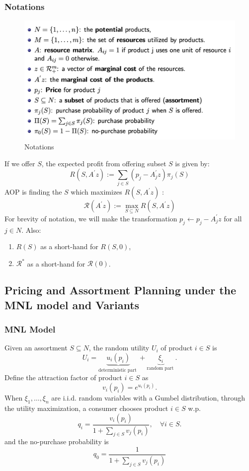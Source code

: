 \documentclass[11pt,a4paper]{article}
\begin{document}
\subsubsection{ Notations}
\begin{center}\begin{figure}[htbp]
    \centering
    \includegraphics[scale=0.4]{A2.png}
    \caption{Notations}
    \label{}
\end{figure}\end{center}
If we offer $S$, the expected profit from offering subset $S$ is given by:
$$
R\left(S, A^{\prime} z\right):=\sum_{j \in S}\left(p_{j}-A_{j}^{\prime} z\right) \pi_{j}(S)
$$
AOP is finding the $S$ which maximizes $R\left(S, A^{\prime} z\right)$ :
$$
\mathcal{R}\left(A^{\prime} z\right):=\max _{S \subseteq N} R\left(S, A^{\prime} z\right)
$$
For brevity of notation, we will make the transformation $p_{j} \leftarrow p_{j}-A_{j}^{\prime} z$ for all $j \in N$. Also:
\begin{enumerate}[$\bullet$]
    \item $R(S)$ as a short-hand for $R(S, 0)$,
    \item $\mathcal{R}^{*}$ as a short-hand for $\mathcal{R}(0)$.
\end{enumerate}

\subsection{ Pricing and Assortment Planning under the MNL model and Variants}
\subsubsection{MNL Model}
Given an assortment $S \subseteq N$, the random utility $U_{i}$ of product $i \in S$ is
$$
U_{i}=\underbrace{u_{i}\left(p_{i}\right)}_{\text {deterministic part }}+\underbrace{\xi_{i}}_{\text {random part }} .
$$
Define the attraction factor of product $i \in S$ as
$$
v_{i}\left(p_{i}\right)=e^{u_{i}\left(p_{i}\right)} .
$$
When $\xi_{1}, \ldots, \xi_{n}$ are i.i.d. random variables with a Gumbel distribution, through the utility maximization, a consumer chooses product $i \in S$ w.p.
$$
q_{i}=\frac{v_{i}\left(p_{i}\right)}{1+\sum_{j \in S} v_{j}\left(p_{i}\right)}, \quad \forall i \in S .
$$
and the no-purchase probability is
$$
q_{0}=\frac{1}{1+\sum_{j \in S} v_{j}\left(p_{i}\right)}
$$
\end{document}
